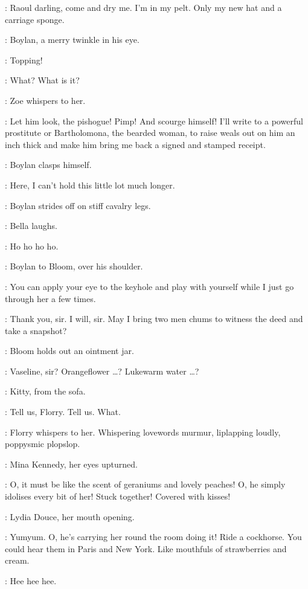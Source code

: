 \Marion:
Raoul darling, come and dry me.
I'm in my pelt.
Only my new hat and a carriage sponge.

:
Boylan, a merry twinkle in his eye.

\Boylan:
Topping!

\Bella:
What?
What is it?

:
Zoe whispers to her.

\Marion:
Let him look, the pishogue!
Pimp!
And scourge himself!
I'll write to a powerful prostitute or Bartholomona, the bearded woman,
to raise weals out on him an inch thick
and make him bring me back a signed and stamped receipt.

:
Boylan clasps himself.

\Boylan:
Here, I can't hold this little lot much longer.

:
Boylan strides off on stiff cavalry legs.

:
Bella laughs.

\Bella:
Ho ho ho ho.

:
Boylan to Bloom, over his shoulder.

\Boylan:
You can apply your eye to the keyhole
and play with yourself while I just go through her a few times.

\Bloom:
Thank you, sir.
I will, sir.
May I bring two men chums to witness the deed and take a snapshot?

:
Bloom holds out an ointment jar.

\Bloom:
Vaseline, sir?
Orangeflower \ldots?
Lukewarm water \ldots?

:
Kitty, from the sofa.

\Kitty:
Tell us, Florry.
Tell us.
What.

:
Florry whispers to her.
Whispering lovewords murmur, liplapping loudly, poppysmic plopslop.

:
Mina Kennedy, her eyes upturned.

\MinaKennedy:
O, it must be like the scent of geraniums and lovely peaches!
O, he simply idolises every bit of her!
Stuck together!
Covered with kisses!

:
Lydia Douce, her mouth opening.

\LydiaDouce:
Yumyum.
O, he's carrying her round the room doing it!
Ride a cockhorse.
You could hear them in Paris and New York.
Like mouthfuls of strawberries and cream.

\Kitty:
Hee hee hee.


